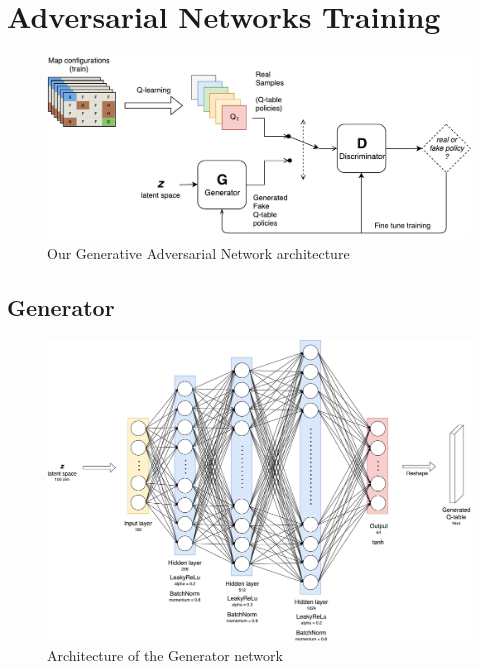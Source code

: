 
\chapter{Adversarial Networks Training} %
\label{Chapter5} %

\begin{figure}
\centering
\includegraphics[width=15cm]{Figures/Q-GAN}
\caption{Our Generative Adversarial Network architecture}
\label{fig:Generator}
\end{figure}





\section{Generator}
\begin{figure}
\centering
\includegraphics[width=15cm]{Figures/Generator}
\caption{Architecture of the Generator network}
\label{fig:Generator}
\end{figure}

